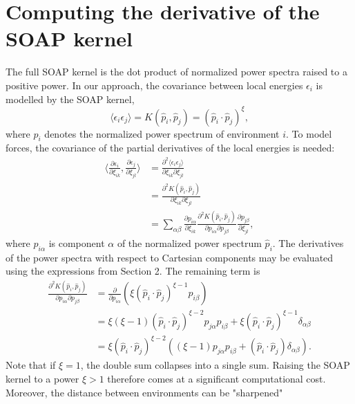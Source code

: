 \documentclass[%
preprint,
amsmath,amssymb,
aps,
]{revtex4-1}
\begin{document}
\section{Computing the derivative of the SOAP kernel}

The full SOAP kernel is the dot product of normalized power spectra raised to a positive power. In our approach, the covariance between local energies $\epsilon_i$ is modelled by the SOAP kernel,
\begin{equation}
\langle \epsilon_i \epsilon_j \rangle = K(\hat{p}_i, \hat{p}_j) = \left( \hat{p}_i \cdot \hat{p}_j \right)^{\xi},
\end{equation}
where $\hat{p}_i$ denotes the normalized power spectrum of environment $i$. To model forces, the covariance of the partial derivatives of the local energies is needed:
\begin{equation}
    \begin{split}
\bigg\langle \frac{\partial \epsilon_i}{\partial \xi_{ik}}, \frac{\partial \epsilon_j}{\partial\xi_{jl}}\bigg\rangle &= \frac{\partial^2 \langle \epsilon_i \epsilon_j \rangle}{\partial \xi_{ik} \partial \xi_{jl}}\\
&= \frac{\partial^2 K(\hat{p}_i, \hat{p}_j)}{\partial \xi_{ik} \partial \xi_{jl}} \\
&= \sum_{\alpha \beta} \frac{\partial p_{i\alpha}}{\partial \xi_{ik}} \frac{\partial^2 K(\hat{p}_i, \hat{p}_j)}{\partial p_{i\alpha} \partial p_{j\beta}} \frac{\partial p_{j\beta}}{\partial \xi_{jl}},
    \end{split}
\end{equation}
where $p_{i\alpha}$ is component $\alpha$ of the normalized power spectrum $\hat{p}_i$. The derivatives of the power spectra with respect to Cartesian components may be evaluated using the expressions from Section 2. The remaining term is
\begin{equation}
\begin{split}
\frac{\partial^2 K(\hat{p}_i, \hat{p}_j)}{\partial p_{i\alpha} \partial p_{j\beta}} &= \frac{\partial}{\partial p_{i \alpha}} \left( \xi (\hat{p}_i \cdot \hat{p}_j)^{\xi - 1} p_{i \beta} \right) \\
&= \xi (\xi - 1) (\hat{p}_i \cdot \hat{p}_j)^{\xi - 2} p_{j\alpha} p_{i \beta} + \xi (\hat{p}_i \cdot \hat{p}_j)^{\xi - 1} \delta_{\alpha \beta} \\
&= \xi (\hat{p}_i \cdot \hat{p}_j)^{\xi - 2} \left( (\xi - 1) p_{j\alpha} p_{i\beta} + (\hat{p}_i \cdot \hat{p}_j) \delta_{\alpha \beta} \right).
\end{split}
\end{equation}
Note that if $\xi = 1$, the double sum collapses into a single sum. Raising the SOAP kernel to a power $\xi > 1$ therefore comes at a significant computational cost. Moreover, the distance between environments can be "sharpened"
\end{document}
